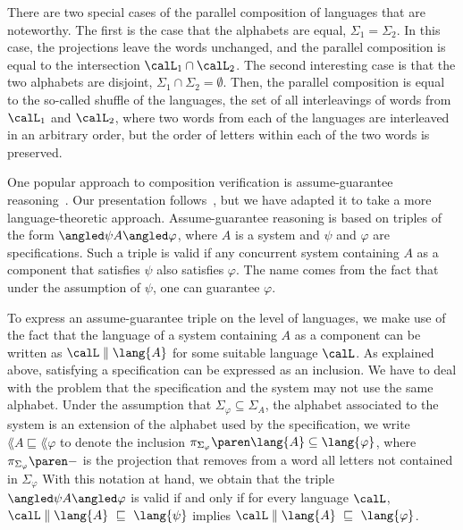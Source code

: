 \documentclass[../../diss.tex]{subfiles}
\begin{document}
There are two special cases of the parallel composition of languages that are noteworthy.
The first is the case that the alphabets are equal, $\Sigma_1 = \Sigma_2$.
In this case, the projections leave the words unchanged, and the parallel composition is equal to the intersection $\calL_1 \cap \calL_2$.
The second interesting case is that the two alphabets are disjoint, $\Sigma_1 \cap \Sigma_2 = \emptyset$.
Then, the parallel composition is equal to the so-called shuffle of the languages, the set of all interleavings of words from $\calL_1$ and $\calL_2$, where two words from each of the languages are interleaved in an arbitrary order, but the order of letters within each of the two words is preserved.

One popular approach to composition verification is assume-guarantee reasoning~\cite{Lamport77,Jones83}.
Our presentation follows~\cite{GiannakopoulouNP18}, but we have adapted it to take a more language-theoretic approach.
Assume-guarantee reasoning is based on triples of the form $\agtriple{\psi}{A}{\varphi}$, where $A$ is a system and $\psi$ and $\varphi$ are specifications.
Such a triple is valid if any concurrent system containing $A$ as a component that satisfies $\psi$ also satisfies $\varphi$.
The name comes from the fact that under the assumption of $\psi$, one can guarantee $\varphi$.

To express an assume-guarantee triple on the level of languages, we make use of the fact that the language of a system containing $A$ as a component can be written as $\calL \parcomp \lang{A}$ for some suitable language $\calL$.
As explained above, satisfying a specification can be expressed as an inclusion.
We have to deal with the problem that the specification and the system may not use the same alphabet.
Under the assumption that $\Sigma_\varphi \subseteq \Sigma_A$, \ie the alphabet associated to the system is an extension of the alphabet used by the specification, we write $\lang{A} \sqsubseteq \lang{\varphi}$ to denote the inclusion $\proj{\Sigma_\varphi}{\lang{A}} \subseteq \lang{\varphi}$, where $\proj{\Sigma_\varphi}{-}$ is the projection that removes from a word all letters not contained in $\Sigma_\varphi$
With this notation at hand, we obtain that the triple $\agtriple{\psi}{A}{\varphi}$ is valid if and only if for every language $\calL$, $\calL \parcomp \lang{A} \ \sqsubseteq  \ \lang{\psi}$ implies $\calL \parcomp \lang{A} \ \sqsubseteq \ \lang{\varphi}$.
\end{document}
